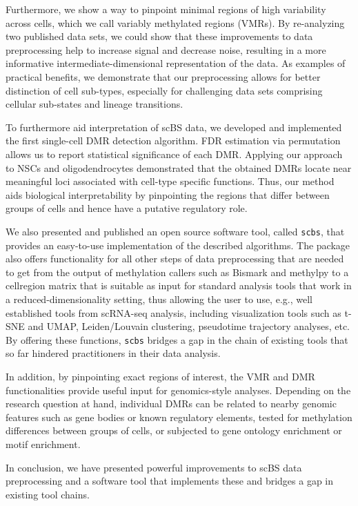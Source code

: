 \documentclass[twocolumn,10pt]{article}
\begin{document}
Furthermore, we show a way to pinpoint minimal regions of high variability across cells, which we call variably methylated regions (VMRs).
By re-analyzing two published data sets, we could show that these improvements to data preprocessing help to increase signal and decrease noise, resulting in a more informative intermediate-dimensional representation of the data.
As examples of practical benefits, we demonstrate that our preprocessing allows for better distinction of cell sub-types, especially for challenging data sets comprising cellular sub-states and lineage transitions.

To furthermore aid interpretation of scBS data, we developed and implemented the first single-cell DMR detection algorithm.
FDR estimation via permutation allows us to report statistical significance of each DMR.
Applying our approach to NSCs and oligodendrocytes demonstrated that the obtained DMRs locate near meaningful loci associated with cell-type specific functions.
Thus, our method aids biological interpretability by pinpointing the regions that differ between groups of cells and hence have a putative regulatory role.

We also presented and published an open source software tool, called \texttt{scbs}, that provides an easy-to-use implementation of the described algorithms.
The package also offers functionality for all other steps of data preprocessing that are needed to get from the output of methylation callers such as Bismark and methylpy to a cell\texttimes region matrix that is suitable as input for standard analysis tools that work in a reduced-dimensionality setting, thus allowing the user to use, e.g., well established tools from scRNA-seq analysis, including visualization tools such as t-SNE and UMAP, Leiden/Louvain clustering, pseudotime trajectory analyses, etc.
By offering these functions, \texttt{scbs} bridges a gap in the chain of existing tools that so far hindered practitioners in their data analysis.

In addition, by pinpointing exact regions of interest, the VMR and DMR functionalities provide useful input for genomics-style analyses.
Depending on the research question at hand, individual DMRs can be related to nearby genomic features such as gene bodies or known regulatory elements, tested for methylation differences between groups of cells, or subjected to gene ontology enrichment or motif enrichment.

In conclusion, we have presented powerful improvements to scBS data preprocessing and a software tool that implements these and bridges a gap in existing tool chains.
\end{document}
